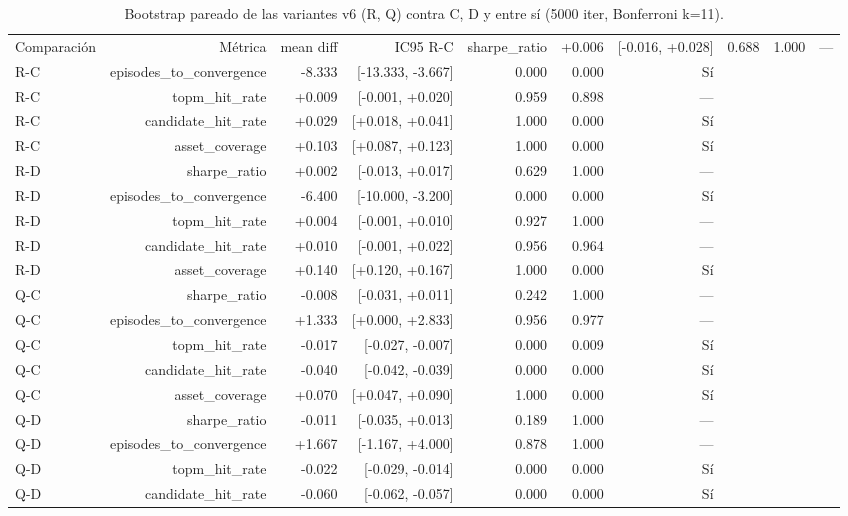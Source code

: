 \begin{table}[H]
\centering
\small
\caption{Bootstrap pareado de las variantes v6 (R, Q) contra C, D y entre sí (5000 iter, Bonferroni k=11).}
\label{tab:tabla_pareado}
\begin{tabular}{lrrrrrr}
\toprule
Comparación & Métrica & mean diff & IC95%
\midrule
R-C & sharpe\_ratio & +0.006 & [-0.016, +0.028] & 0.688 & 1.000 & — \\
R-C & episodes\_to\_convergence & -8.333 & [-13.333, -3.667] & 0.000 & 0.000 & Sí \\
R-C & topm\_hit\_rate & +0.009 & [-0.001, +0.020] & 0.959 & 0.898 & — \\
R-C & candidate\_hit\_rate & +0.029 & [+0.018, +0.041] & 1.000 & 0.000 & Sí \\
R-C & asset\_coverage & +0.103 & [+0.087, +0.123] & 1.000 & 0.000 & Sí \\
R-D & sharpe\_ratio & +0.002 & [-0.013, +0.017] & 0.629 & 1.000 & — \\
R-D & episodes\_to\_convergence & -6.400 & [-10.000, -3.200] & 0.000 & 0.000 & Sí \\
R-D & topm\_hit\_rate & +0.004 & [-0.001, +0.010] & 0.927 & 1.000 & — \\
R-D & candidate\_hit\_rate & +0.010 & [-0.001, +0.022] & 0.956 & 0.964 & — \\
R-D & asset\_coverage & +0.140 & [+0.120, +0.167] & 1.000 & 0.000 & Sí \\
Q-C & sharpe\_ratio & -0.008 & [-0.031, +0.011] & 0.242 & 1.000 & — \\
Q-C & episodes\_to\_convergence & +1.333 & [+0.000, +2.833] & 0.956 & 0.977 & — \\
Q-C & topm\_hit\_rate & -0.017 & [-0.027, -0.007] & 0.000 & 0.009 & Sí \\
Q-C & candidate\_hit\_rate & -0.040 & [-0.042, -0.039] & 0.000 & 0.000 & Sí \\
Q-C & asset\_coverage & +0.070 & [+0.047, +0.090] & 1.000 & 0.000 & Sí \\
Q-D & sharpe\_ratio & -0.011 & [-0.035, +0.013] & 0.189 & 1.000 & — \\
Q-D & episodes\_to\_convergence & +1.667 & [-1.167, +4.000] & 0.878 & 1.000 & — \\
Q-D & topm\_hit\_rate & -0.022 & [-0.029, -0.014] & 0.000 & 0.000 & Sí \\
Q-D & candidate\_hit\_rate & -0.060 & [-0.062, -0.057] & 0.000 & 0.000 & Sí \\

\end{tabular}
\end{table}

